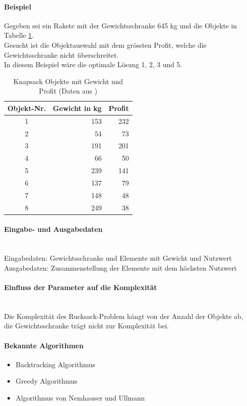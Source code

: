 	\paragraph{Beispiel} Gegeben sei ein Rakete mit der Gewichtsschranke 645 kg und die Objekte in Tabelle \ref{table:knapsack_objects}.\\
Gesucht ist die Objektauswahl mit dem grössten Profit, welche die Gewichtsschranke nicht überschreitet.\\
In diesem Beispiel wäre die optimale Lösung 1, 2, 3 und 5. \cite{knapsack_desc_web}

\begin{table}[ht]
\centering
  \begin{tabular}{ c | r | r }
	\hline
	\rowcolor{gray}
	\textbf{Objekt-Nr.}	&	\textbf{Gewicht in kg}	&	\textbf{Profit}\\ \hline
	1			&	153			&	232\\ \hline
	2			&	54			&	73\\ \hline
	3			&	191			&	201\\ \hline
	4			&	66			&	50\\ \hline
	5			&	239			&	141\\ \hline
	6			&	137			&	79\\ \hline
	7			&	148			&	48\\ \hline
	8			&	249			&	38
  \end{tabular}
   \caption[Knapsack Objekte mit Gewicht und Profit]{Knapsack Objekte mit Gewicht und Profit (Daten aus \cite{knapsack_desc_web})}\label{table:knapsack_objects}
\end{table}

	\paragraph{Eingabe- und Ausgabedaten}\mbox{}\\
	Eingabedaten: Gewichtsschranke und Elemente mit Gewicht und Nutzwert\\
	Ausgabedaten: Zusammenstellung der Elemente mit dem höchsten Nutzwert

	\paragraph{Einfluss der Parameter auf die Komplexität}\mbox{}\\
	Die Komplexität des Rucksack-Problem hängt von der Anzahl der Objekte ab, die Gewichtsschranke trägt nicht zur Komplexität bei.

	\paragraph{Bekannte Algorithmen}
	\begin{itemize}
		\item Backtracking Algorithmus
		\item Greedy Algorithmus
		\item Algorithmus von Nemhauser und Ullmann \cite{knapsack_desc_web}
	\end{itemize}	

